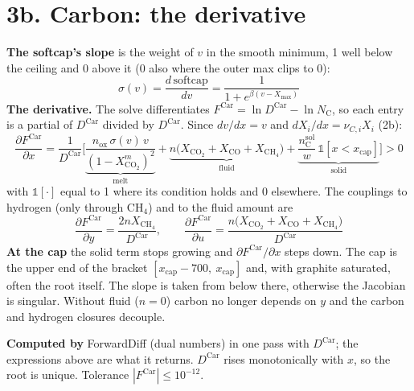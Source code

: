 \documentclass[11pt]{article}
\newcommand{\nox}{n_{\mathrm{ox}}}
\newcommand{\Xm}[1]{X^{m}_{\mathrm{#1}}}
\begin{document}
\section*{3b. Carbon: the derivative}
\vspace*{\fill}
\begin{minipage}[t]{\linewidth}\vspace{0pt}\small\setlength{\abovedisplayskip}{13pt}\setlength{\belowdisplayskip}{13pt}\setlength{\abovedisplayshortskip}{13pt}\setlength{\belowdisplayshortskip}{13pt}
\textbf{The softcap's slope} is the weight of $v$ in the smooth minimum, 1 well below the ceiling and 0 above it (0 also where the outer max clips to 0):
\begin{equation}
  \sigma(v)=\frac{d\,\mathrm{softcap}}{dv}=\frac{1}{1+e^{\beta(v-X_{\max})}}
\end{equation}
\textbf{The derivative.} The solve differentiates $F^{\mathrm{Car}}=\ln D^{\mathrm{Car}}-\ln N_{\mathrm C}$, so each entry is a partial of $D^{\mathrm{Car}}$ divided by $D^{\mathrm{Car}}$. Since $dv/dx=v$ and $dX_i/dx=\nu_{C,i}X_i$ (2b):
\begin{equation}
  \frac{\partial F^{\mathrm{Car}}}{\partial x}=\frac{1}{D^{\mathrm{Car}}}\Big[
  \underbrace{\frac{\nox\,\sigma(v)\,v}{(1-\Xm{CO_2})^2}}_{\text{melt}}
  +\underbrace{n\big(X_{\mathrm{CO_2}}+X_{\mathrm{CO}}+X_{\mathrm{CH_4}}\big)}_{\text{fluid}}
  +\underbrace{\frac{n_{\mathrm C}^{\mathrm{sol}}}{w}\,\mathbb 1[x<x_{\mathrm{cap}}]}_{\text{solid}}\Big]>0
\end{equation}
with $\mathbb 1[\cdot]$ equal to 1 where its condition holds and 0 elsewhere. The couplings to hydrogen (only through CH$_4$) and to the fluid amount are
\begin{equation}
  \frac{\partial F^{\mathrm{Car}}}{\partial y}=\frac{2nX_{\mathrm{CH_4}}}{D^{\mathrm{Car}}},\qquad
  \frac{\partial F^{\mathrm{Car}}}{\partial u}=\frac{n\big(X_{\mathrm{CO_2}}+X_{\mathrm{CO}}+X_{\mathrm{CH_4}}\big)}{D^{\mathrm{Car}}}
\end{equation}
\textbf{At the cap} the solid term stops growing and $\partial F^{\mathrm{Car}}/\partial x$ steps down. The cap is the upper end of the bracket $[x_{\mathrm{cap}}-700,\ x_{\mathrm{cap}}]$ and, with graphite saturated, often the root itself. The slope is taken from below there, otherwise the Jacobian is singular. Without fluid ($n=0$) carbon no longer depends on $y$ and the carbon and hydrogen closures decouple.

\textbf{Computed by} ForwardDiff (dual numbers) in one pass with $D^{\mathrm{Car}}$; the expressions above are what it returns. $D^{\mathrm{Car}}$ rises monotonically with $x$, so the root is unique. Tolerance $|F^{\mathrm{Car}}|\le10^{-12}$.
\end{minipage}
\end{document}
